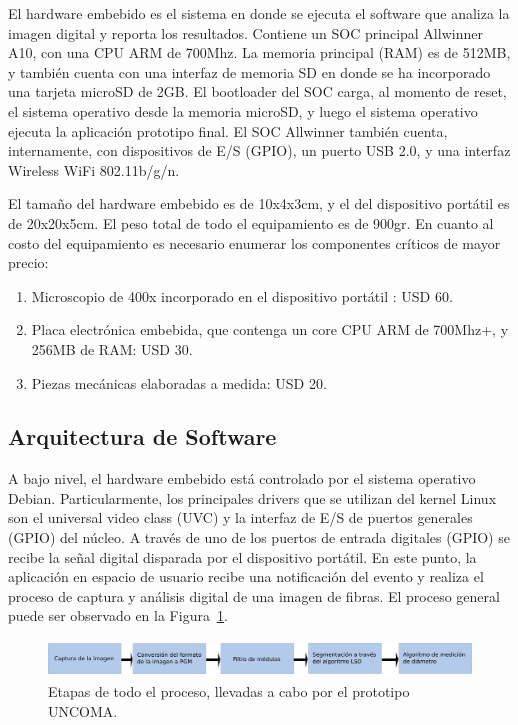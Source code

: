 \documentclass[runningheads,a4paper]{llncs}
\begin{document}
El hardware embebido es el sistema en donde se ejecuta el software
que analiza la imagen digital y reporta los resultados. Contiene un SOC principal Allwinner A10, con una CPU ARM de 700Mhz. La memoria principal (RAM) es de 512MB, y también cuenta con una interfaz de memoria SD en donde se ha incorporado una tarjeta microSD de 2GB. El bootloader del SOC carga, al momento de reset, el sistema
operativo desde la memoria microSD, y luego el sistema operativo ejecuta
la aplicación prototipo final.
El SOC Allwinner también cuenta, internamente, con dispositivos de E/S (GPIO), un puerto USB 2.0, y una interfaz Wireless WiFi 802.11b/g/n.

El tamaño del hardware embebido es de 10x4x3cm, y el del dispositivo portátil es de 20x20x5cm. El peso total de todo el equipamiento es de 900gr. 
En cuanto al costo del equipamiento es necesario enumerar los componentes
críticos de mayor precio:
\begin{enumerate}
\item Microscopio de 400x incorporado en el dispositivo portátil : USD 60.
\item Placa electrónica embebida, que contenga un core CPU ARM de 700Mhz+, y 256MB de RAM: USD 30.
\item Piezas mecánicas elaboradas a medida: USD 20.
\end{enumerate}


\subsection{Arquitectura de Software}

%
A bajo nivel, el hardware embebido está controlado por el sistema operativo Debian. Particularmente, los principales drivers que se utilizan del kernel Linux son el universal video class (UVC) y la interfaz de E/S de puertos generales (GPIO) del núcleo.
A través de uno de los puertos de entrada digitales (GPIO) se recibe la señal digital disparada por el dispositivo portátil. En este punto, la aplicación en espacio de usuario recibe una notificación del evento y realiza el proceso de captura y análisis digital de una imagen de fibras. El proceso general puede ser observado en la Figura~\ref{fig:proceso}.
\begin{figure}
\centering
\includegraphics[height=1cm]{proceso}
\caption{Etapas de todo el proceso, llevadas a cabo por el prototipo UNCOMA.}
\label{fig:proceso}
\end{figure}
\end{document}
